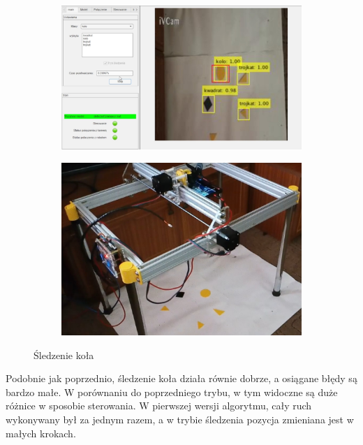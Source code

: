  \begin{figure}[H]
	\centering
	\begin{subfigure}{}
		\includegraphics[width=0.5\linewidth]{pages/testy/img/test2_2_2.jpg}
	\end{subfigure}
	\begin{subfigure}{}
		\includegraphics[width=0.4\linewidth]{pages/testy/img/test2_2_1.jpg}
	\end{subfigure}
	\caption{Śledzenie koła}
\end{figure}
Podobnie jak poprzednio, śledzenie koła działa równie dobrze, a osiągane błędy są bardzo małe. 
W porównaniu do poprzedniego trybu, w tym widoczne są duże różnice w sposobie sterowania. W pierwszej wersji algorytmu, cały ruch wykonywany był za jednym razem, a w trybie śledzenia pozycja zmieniana jest w małych krokach.